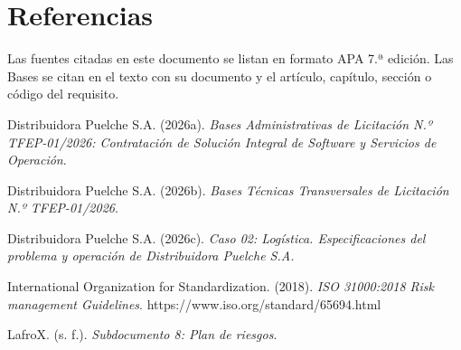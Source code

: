\documentclass[carta,firma,sinnotas]{lafrox}
\begin{document}
\section*{Referencias}

Las fuentes citadas en este documento se listan en formato APA 7.ª edición. Las Bases se citan en el texto con su documento y el artículo, capítulo, sección o código del requisito.

\begingroup
\small\setlength{\parindent}{-0.5in}\setlength{\leftskip}{0.5in}\setlength{\parskip}{3pt}
Distribuidora Puelche S.A. (2026a). \emph{Bases Administrativas de Licitación N.º TFEP-01/2026: Contratación de Solución Integral de Software y Servicios de Operación}.

Distribuidora Puelche S.A. (2026b). \emph{Bases Técnicas Transversales de Licitación N.º TFEP-01/2026}.

Distribuidora Puelche S.A. (2026c). \emph{Caso 02: Logística. Especificaciones del problema y operación de Distribuidora Puelche S.A.}

International Organization for Standardization. (2018). \emph{ISO 31000:2018 Risk management \textemdash{} Guidelines}. https://www.iso.org/standard/65694.html

LafroX. (s. f.). \emph{Subdocumento 8: Plan de riesgos}.

\endgroup
\end{document}

